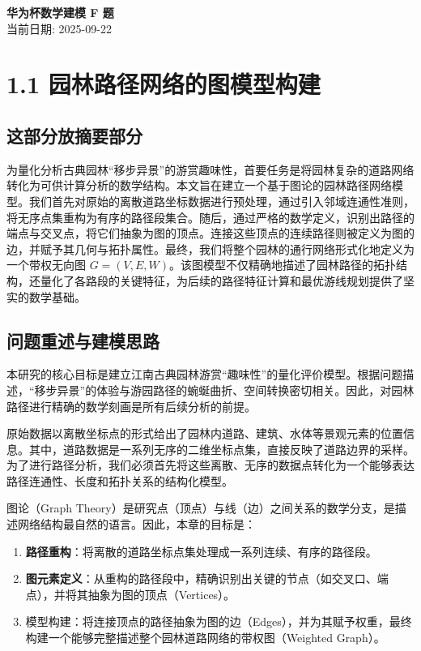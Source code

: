 \documentclass[11pt]{article}
\theoremstyle{definition}
\begin{document}
	\setcounter{section}{0}
	
	\thispagestyle{empty}
	
\begin{center}
	{\LARGE \bf 华为杯数学建模 F 题}\\
	当前日期: 2025-09-22
\end{center}



\section*{1.1 园林路径网络的图模型构建}	


\subsection*{这部分放摘要部分}
为量化分析古典园林“移步异景”的游赏趣味性，首要任务是将园林复杂的道路网络转化为可供计算分析的数学结构。本文旨在建立一个基于图论的园林路径网络模型。我们首先对原始的离散道路坐标数据进行预处理，通过引入邻域连通性准则，将无序点集重构为有序的路径段集合。随后，通过严格的数学定义，识别出路径的端点与交叉点，将它们抽象为图的顶点。连接这些顶点的连续路径则被定义为图的边，并赋予其几何与拓扑属性。最终，我们将整个园林的通行网络形式化地定义为一个带权无向图 $G=(V, E, W)$。该图模型不仅精确地描述了园林路径的拓扑结构，还量化了各路段的关键特征，为后续的路径特征计算和最优游线规划提供了坚实的数学基础。


\subsection*{问题重述与建模思路}


本研究的核心目标是建立江南古典园林游赏“趣味性”的量化评价模型。根据问题描述，“移步异景”的体验与游园路径的蜿蜒曲折、空间转换密切相关。因此，对园林路径进行精确的数学刻画是所有后续分析的前提。

原始数据以离散坐标点的形式给出了园林内道路、建筑、水体等景观元素的位置信息。其中，道路数据是一系列无序的二维坐标点集，直接反映了道路边界的采样。为了进行路径分析，我们必须首先将这些离散、无序的数据点转化为一个能够表达路径连通性、长度和拓扑关系的结构化模型。

图论（Graph Theory）是研究点（顶点）与线（边）之间关系的数学分支，是描述网络结构最自然的语言。因此，本章的目标是：

\begin{enumerate}
	\item \textbf{路径重构}：将离散的道路坐标点集处理成一系列连续、有序的路径段。
	\item \textbf{图元素定义}：从重构的路径段中，精确识别出关键的节点（如交叉口、端点），并将其抽象为图的顶点（Vertices）。
	\item  模型构建：将连接顶点的路径抽象为图的边（Edges），并为其赋予权重，最终构建一个能够完整描述整个园林道路网络的带权图（Weighted Graph）。
\end{enumerate}
\end{document}
